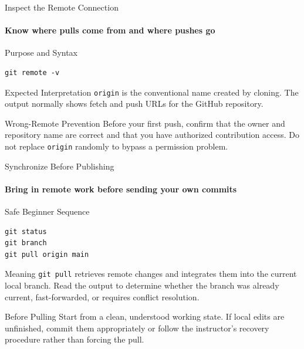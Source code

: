 \begin{frame}[fragile]{Inspect the Remote Connection}
\framesubtitle{Know where pulls come from and where pushes go}
\footnotesize
\begin{block}{Purpose and Syntax}
\begin{verbatim}
git remote -v
\end{verbatim}
\end{block}
\begin{exampleblock}{Expected Interpretation}
\texttt{origin} is the conventional name created by cloning. The output normally shows fetch and push URLs for the GitHub repository.
\end{exampleblock}
\begin{alertblock}{Wrong-Remote Prevention}
Before your first push, confirm that the owner and repository name are correct and that you have authorized contribution access. Do not replace \texttt{origin} randomly to bypass a permission problem.
\end{alertblock}
\end{frame}

\begin{frame}[fragile]{Synchronize Before Publishing}
\framesubtitle{Bring in remote work before sending your own commits}
\footnotesize
\begin{block}{Safe Beginner Sequence}
\begin{verbatim}
git status
git branch
git pull origin main
\end{verbatim}
\end{block}
\begin{exampleblock}{Meaning}
\texttt{git pull} retrieves remote changes and integrates them into the current local branch. Read the output to determine whether the branch was already current, fast-forwarded, or requires conflict resolution.
\end{exampleblock}
\begin{alertblock}{Before Pulling}
Start from a clean, understood working state. If local edits are unfinished, commit them appropriately or follow the instructor's recovery procedure rather than forcing the pull.
\end{alertblock}
\end{frame}

